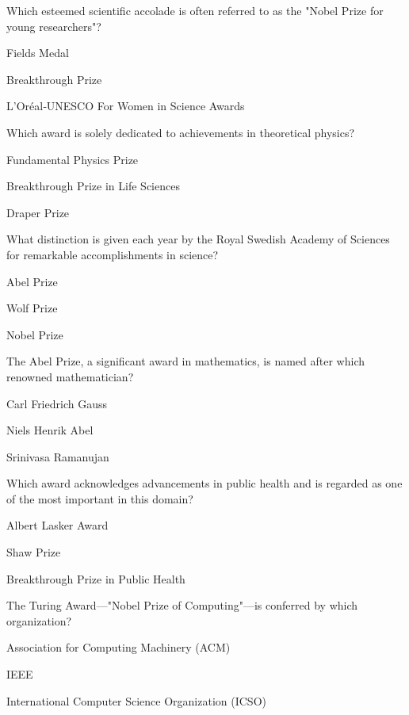 
\begin{enhancedmcq}{Which esteemed scientific accolade is often referred to as the "Nobel Prize for young researchers"?}
\item Fields Medal
\item Breakthrough Prize
\item L'Oréal‑UNESCO For Women in Science Awards

\end{enhancedmcq}
\begin{enhancedmcq}{Which award is solely dedicated to achievements in theoretical physics?}
\item Fundamental Physics Prize
\item Breakthrough Prize in Life Sciences
\item Draper Prize

\end{enhancedmcq}
\begin{enhancedmcq}{What distinction is given each year by the Royal Swedish Academy of Sciences for remarkable accomplishments in science?}
\item Abel Prize
\item Wolf Prize
\item Nobel Prize

\end{enhancedmcq}
\begin{enhancedmcq}{The Abel Prize, a significant award in mathematics, is named after which renowned mathematician?}
\item Carl Friedrich Gauss
\item Niels Henrik Abel
\item Srinivasa Ramanujan

\end{enhancedmcq}
\begin{enhancedmcq}{Which award acknowledges advancements in public health and is regarded as one of the most important in this domain?}
\item Albert Lasker Award
\item Shaw Prize
\item Breakthrough Prize in Public Health

\end{enhancedmcq}
\begin{enhancedmcq}{The Turing Award—"Nobel Prize of Computing"—is conferred by which organization?}
\item Association for Computing Machinery (ACM)
\item IEEE
\item International Computer Science Organization (ICSO)

\end{enhancedmcq}
